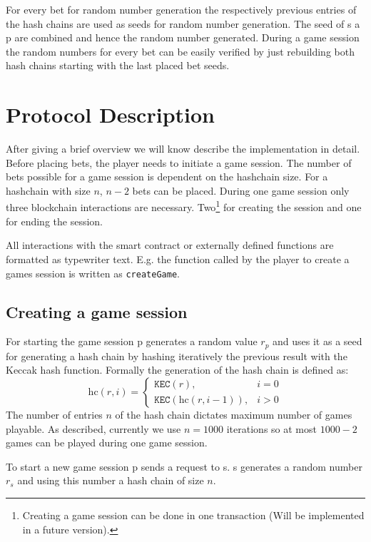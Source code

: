 \documentclass[oneside]{amsart}
\makeatletter
\newcommand*\Eg{E.g.\@\xspace}
\newcommand{\kec}{\texttt{KEC}}
\makeatother
\begin{document}
\begin{multicols}{2}
For every bet for random number generation the respectively  previous entries of the hash chains are used
as seeds for random number generation.
The seed of \gls{s} a \gls{p} are combined and hence the random number generated.
During a game session the random numbers for every bet can be easily verified by just rebuilding both hash chains
starting with the last placed bet seeds.

\section{Protocol Description}\label{sec:protocolDescription}
After giving a brief overview we will know describe the implementation in detail.
Before placing bets, the player needs to initiate a game session.
The number of bets possible for a game session is dependent on the hashchain size.
For a hashchain with size $n$, $n - 2$ bets can be placed.
During one game session only three blockchain interactions are necessary.
Two\footnote{Creating a game session can be done in one transaction (Will be implemented in a future version).}
for creating the session and one for ending the session.

All interactions with the smart contract or externally defined functions are formatted as typewriter text.
\Eg the function called by the player to create a games session is written as \texttt{createGame}.

\subsection{Creating a game session}\label{subsec:creatingGameSession}
For starting the game session \gls{p} generates a random value $r_p$ and uses it as a seed for generating a hash chain by hashing iteratively the
previous result with the Keccak hash function.
Formally the generation of the hash chain is defined as:
\begin{equation}
    \text{hc}(r, i) =
    \begin{cases}
        \kec(r), & i = 0 \\
        \kec(\text{hc}(r, i-1)), & i > 0
    \end{cases}
\end{equation}
The number of entries $n$ of the hash chain dictates maximum number of games playable.
As described, currently we use $n = 1000$ iterations so at most $1000 - 2$ games can be played during one game session.

To start a new game session \gls{p} sends a request to \gls{s}.
\Gls{s} generates a random number $r_s$ and using this number a hash chain of size $n$.


\end{multicols}
\end{document}
